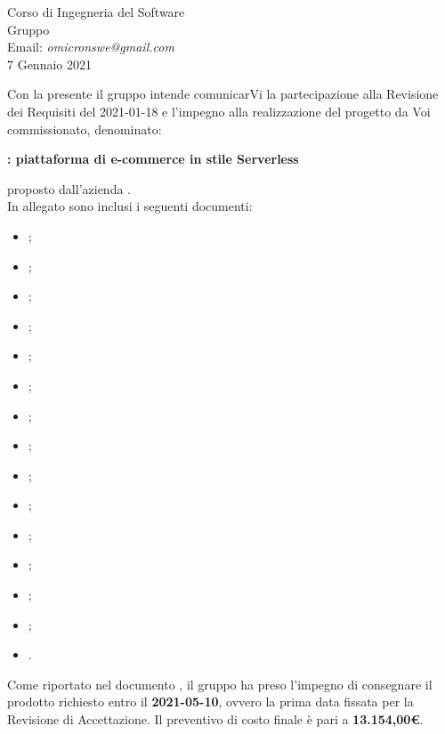 \documentclass[12pt,a4paper]{letter}
\begin{document}
\begin{letter}
{\begin{flushleft}
			\vspace{1cm}
            Corso di Ingegneria del Software\\ Gruppo \Omicron{}\\ Email:  \textit{omicronswe@gmail.com} \\ 7 Gennaio 2021 
        \end{flushleft}
        }
        \opening{ Con la presente il gruppo \Omicron{} intende comunicarVi la partecipazione alla Revisione dei Requisiti del 2021-01-18 e l'impegno alla realizzazione del progetto da Voi commissionato, denominato:}
        \begin{center}
           \textbf{\nameproject{} : piattaforma di e-commerce in stile Serverless} 
        \end{center}
        proposto dall'azienda \textit{\Proponente{}}.\\
        In allegato sono inclusi i seguenti documenti:
            \begin{itemize}
                \item {};
                \item {};
                \item {};
                \item {};
                \item {};
                \item {};
                \item {};
                \item {};
                \item {};
                \item {};
                \item {};
                \item {};
                \item {};
                \item {};
                \item {}.
            \end{itemize}
        
        Come riportato nel documento , il gruppo ha preso l'impegno di consegnare il prodotto richiesto entro il \textbf{2021-05-10}, ovvero la prima data fissata per la Revisione di Accettazione. Il preventivo di costo finale è pari a \textbf{13.154,00\euro{}}.
        

\end{letter}
\end{document}
